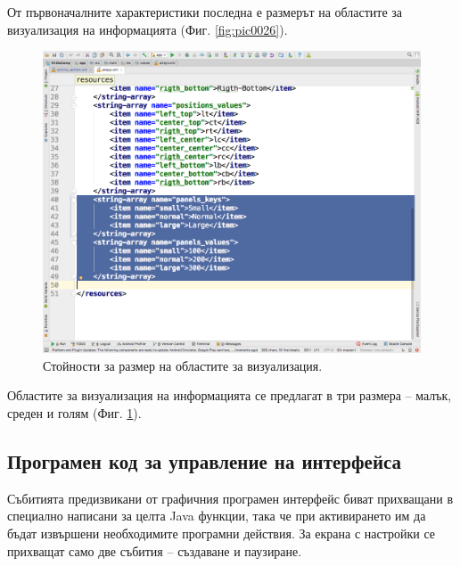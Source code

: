 \documentclass[book,14pt,oneside,openany]{memoir}
\begin{document}
От първоначалните характеристики последна е размерът на областите за визуализация на информацията (Фиг. \ref{fig:pic0026}). 

\begin{figure}[h]
  \centering
  \includegraphics[height=0.45\pdfpageheight]{pic0027}
  \caption{Стойности за размер на областите за визуализация.}
\label{fig:pic0027}
\end{figure}
\FloatBarrier

Областите за визуализация на информацията се предлагат в три размера – малък, среден и голям (Фиг. \ref{fig:pic0027}).

\subsection{Програмен код за управление на интерфейса}

Събитията предизвикани от графичния програмен интерфейс биват прихващани в специално написани за целта Java функции, така че при активирането им да бъдат извършени необходимите програмни действия. За екрана с настройки се прихващат само две събития – създаване и паузиране. 
\end{document}
